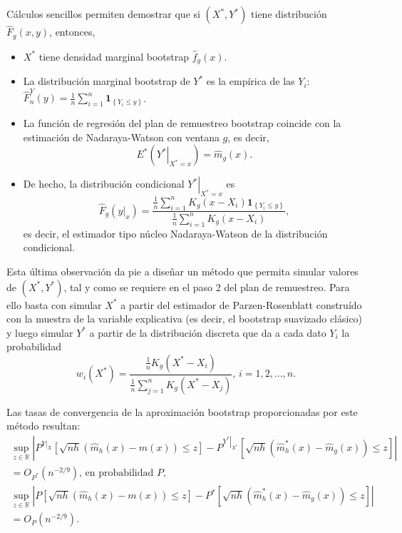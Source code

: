 \documentclass[
]{book}
\renewcommand{\mathbf}[1]{\symbf{#1}}
\theoremstyle{break}
\theoremstyle{nonumberplain}
\begin{document}
Cálculos sencillos permiten demostrar que si \(\left( X^{\ast},Y^{\ast}
\right)\) tiene distribución \(\hat{F}_{g}\left( x,y \right)\), entonces,

\begin{itemize}
\item
  \(X^{\ast}\) tiene densidad marginal bootstrap \(\hat{f}_{g}\left(
  x \right)\).
\item
  La distribución marginal bootstrap de \(Y^{\ast}\) es la empírica de
  las \(Y_i\): \(\hat{F}_n^{Y}\left( y \right) =\frac{1}{n}
  \sum_{i=1}^{n}\mathbf{1}_{\left\{ Y_i\leq y\right\} }\).
\item
  La función de regresión del plan de remuestreo bootstrap coincide
  con la estimación de Nadaraya-Watson con ventana \(g\), es decir,
  \[E^{\ast}\left( \left. Y^{\ast}\right\vert _{X^{\ast}=x} \right)
  =\hat{m}_{g}\left( x \right).\]
\item
  De hecho, la distribución condicional \(\left. Y^{\ast}\right\vert
  _{X^{\ast}=x}\) es
  \[\hat{F}_{g}\left( \left. y\right\vert _{x} \right) =\frac{\frac{1}{n}
  \sum_{i=1}^{n}K_{g}\left( x-X_i \right) \mathbf{1}_{\left\{ Y_i\leq
  y\right\} }}{\frac{1}{n}\sum_{i=1}^{n}K_{g}\left( x-X_i \right)},\]
  es decir, el estimador tipo núcleo Nadaraya-Watson de la distribución
  condicional.
\end{itemize}

Esta última observación da pie a diseñar un método que permita simular
valores de \(\left( X^{\ast},Y^{\ast} \right)\), tal y como se requiere
en el paso 2 del plan de remuestreo. Para ello basta con simular
\(X^{\ast}\) a partir del estimador de Parzen-Rosenblatt construído con
la muestra de la variable explicativa (es decir, el bootstrap suavizado
clásico) y luego simular \(Y^{\ast}\) a partir de la distribución
discreta que da a cada dato \(Y_i\) la probabilidad
\[w_i\left( X^{\ast} \right) =\frac{\frac{1}{n}K_{g}\left( X^{\ast}
-X_i \right)}{\frac{1}{n}\sum_{j=1}^{n}K_{g}\left( X^{\ast}-X_j \right)}
\text{, }i=1,2,\ldots ,n\text{.}\]

Las tasas de convergencia de la aproximación bootstrap proporcionadas
por este método resultan:
\[\begin{gathered}
\sup_{z\in \mathbb{R}}\left\vert P^{\left. Y\right\vert _{X}}\left[ 
\sqrt{nh}\left( \hat{m}_{h}\left( x \right) -m\left( x \right) \right) \leq z
\right]  -P^{\left. Y^{\ast}\right\vert _{X^{\ast}}}\left[ \sqrt{nh}\left( 
\hat{m}_{h}^{\ast}\left( x \right) -\hat{m}_{g}\left( x \right) \right) \leq z
\right] \right\vert \\
=O_{P^{\ast}}\left( n^{-2/9} \right) \text{, en probabilidad }P, \\
\sup_{z\in \mathbb{R}}\left\vert P\left[ \sqrt{nh}\left( \hat{m}
_{h}\left( x \right) -m\left( x \right) \right) \leq z\right] -P^{\ast}\left[ 
\sqrt{nh}\left( \hat{m}_{h}^{\ast}\left( x \right) -\hat{m}_{g}\left(
x \right) \right) \leq z\right] \right\vert \\
=O_{P}\left( n^{-2/9} \right).
\end{gathered}\]
\end{document}
